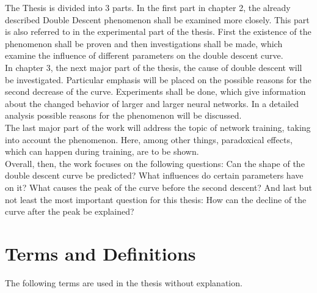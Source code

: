 The Thesis is divided into 3 parts. In the first part in chapter 2, the already described Double Descent phenomenon shall be examined more closely. This part is also referred to in the experimental part of the thesis. First the existence of the phenomenon shall be proven and then investigations shall be made, which examine the influence of different parameters on the double descent curve. \\
In chapter 3, the next major part of the thesis, the cause of double descent will be investigated. Particular emphasis will be placed on the possible reasons for the second decrease of the curve. Experiments shall be done, which give information about the changed behavior of larger and larger neural networks. In a detailed analysis possible reasons for the phenomenon will be discussed. \\
The last major part of the work will address the topic of network training, taking into account the phenomenon. Here, among other things, paradoxical effects, which can happen during training, are to be shown. \\
Overall, then, the work focuses on the following questions: Can the shape of the double descent curve be predicted? What influences do certain parameters have on it? What causes the peak of the curve before the second descent? And last but not least the most important question for this thesis: How can the decline of the curve after the peak be explained?




\section{Terms and Definitions}
The following terms are used in the thesis without explanation. 

